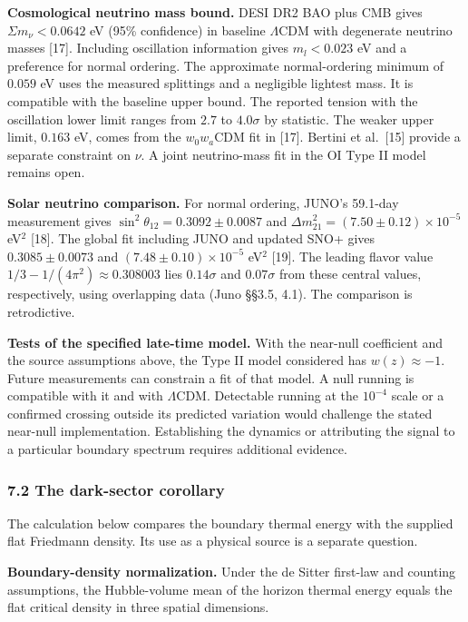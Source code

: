 \documentclass[
]{article}
\begin{document}
\textbf{Cosmological neutrino mass bound.} DESI DR2 BAO plus CMB gives
\(\Sigma m_\nu < 0.0642\) eV (95\% confidence) in baseline
\(\Lambda\)CDM with degenerate neutrino masses {[}17{]}. Including
oscillation information gives \(m_l < 0.023\) eV and a preference for
normal ordering. The approximate normal-ordering minimum of \(0.059\) eV
uses the measured splittings and a negligible lightest mass. It is
compatible with the baseline upper bound. The reported tension with the
oscillation lower limit ranges from \(2.7\) to \(4.0\sigma\) by
statistic. The weaker upper limit, \(0.163\) eV, comes from the
\(w_0w_a\)CDM fit in {[}17{]}. Bertini et al.~{[}15{]} provide a
separate constraint on \(\nu\). A joint neutrino-mass fit in the OI Type
II model remains open.

\textbf{Solar neutrino comparison.} For normal ordering, JUNO's 59.1-day
measurement gives \(\sin^2\theta_{12}=0.3092\pm0.0087\) and
\(\Delta m_{21}^2=(7.50\pm0.12)\times10^{-5}\) eV\(^2\) {[}18{]}. The
global fit including JUNO and updated SNO+ gives \(0.3085\pm0.0073\) and
\((7.48\pm0.10)\times10^{-5}\) eV\(^2\) {[}19{]}. The leading flavor
value \(1/3-1/(4\pi^2)\approx0.308003\) lies \(0.14\sigma\) and
\(0.07\sigma\) from these central values, respectively, using
overlapping data (Juno §§3.5, 4.1). The comparison is retrodictive.

\textbf{Tests of the specified late-time model.} With the near-null
coefficient and the source assumptions above, the Type II model
considered has \(w(z)\approx-1\). Future measurements can constrain a
fit of that model. A null running is compatible with it and with
\(\Lambda\)CDM. Detectable running at the \(10^{-4}\) scale or a
confirmed crossing outside its predicted variation would challenge the
stated near-null implementation. Establishing the dynamics or
attributing the signal to a particular boundary spectrum requires
additional evidence.

\hypertarget{the-dark-sector-corollary}{%
\subsubsection{7.2 The dark-sector
corollary}\label{the-dark-sector-corollary}}

The calculation below compares the boundary thermal energy with the
supplied flat Friedmann density. Its use as a physical source is a
separate question.

\textbf{Boundary-density normalization.} Under the de Sitter first-law
and counting assumptions, the Hubble-volume mean of the horizon thermal
energy equals the flat critical density in three spatial dimensions.
\end{document}
